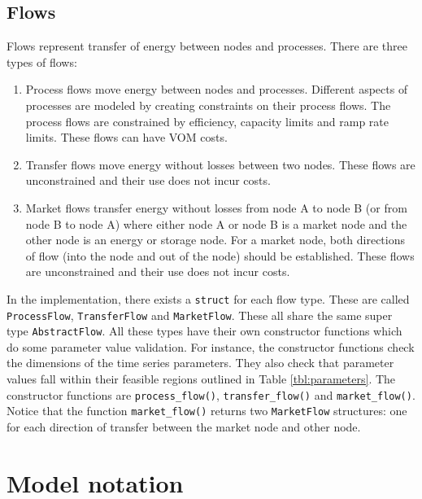 \documentclass{article}
\begin{document}
\subsection{Flows}
Flows represent transfer of energy between nodes and processes. There are three types of flows:
\begin{enumerate}
    \item Process flows move energy between nodes and processes. Different aspects of processes are modeled by creating constraints on their process flows. The process flows are constrained by efficiency, capacity limits and ramp rate limits. These flows can have VOM costs.
    
    \item Transfer flows move energy without losses between two nodes. These flows are unconstrained and their use does not incur costs. %
    
    \item Market flows transfer energy without losses from node A to node B (or from node B to node A) where either node A or node B is a market node and the other node is an energy or storage node. For a market node, both directions of flow (into the node and out of the node) should be established. These flows are unconstrained and their use does not incur costs.
\end{enumerate}

In the implementation, there exists a \texttt{struct} for each flow type. These are called \texttt{ProcessFlow}, \texttt{TransferFlow} and \texttt{MarketFlow}. These all share the same super type \texttt{AbstractFlow}. All these types have their own constructor functions which do some parameter value validation. For instance, the constructor functions check the dimensions of the time series parameters. They also check that parameter values fall within their feasible regions outlined in Table \ref{tbl:parameters}. The constructor functions are \texttt{process\_flow()}, \texttt{transfer\_flow()} and \texttt{market\_flow()}. Notice that the function \texttt{market\_flow()} returns two \texttt{MarketFlow} structures: one for each direction of transfer between the market node and other node.


\section{Model notation}
\end{document}
